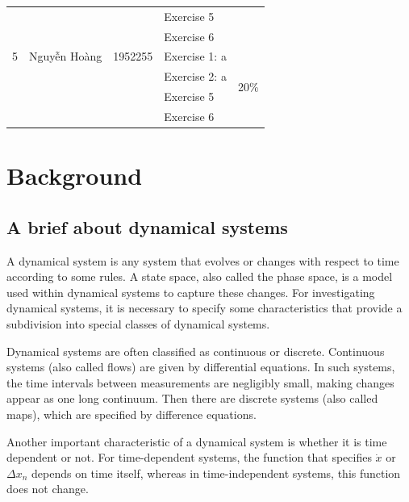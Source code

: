 \documentclass[a4paper]{article}
\numberwithin{equation}{section}
\begin{document}
\begin{center}
\begin{tabular}{llclc}
                 &                       &                     & Exercise 5        &                             \\
                 &                       &                     & Exercise 6        &                             \\
    \midrule
    5            & Nguyễn Hoàng          & 1952255             & Exercise 1: a     & \multirow{4}{*}{20\%}       \\
                 &                       &                     & Exercise 2: a     &                             \\
                 &                       &                     & Exercise 5        &                             \\
                 &                       &                     & Exercise 6        &                             \\
    \bottomrule
  \end{tabular}
\end{center}


\newpage
\section{Background}
\subsection{A brief about dynamical systems}
A dynamical system is any system that evolves or changes with respect to time according to some rules.
A state space, also called the phase space, is a model used within dynamical systems to capture these changes.
For investigating dynamical systems, it is necessary to specify some characteristics that provide a subdivision into special classes of dynamical systems.

Dynamical systems are often classified as continuous or discrete.
Continuous systems (also called flows) are given by differential equations.
In such systems, the time intervals between measurements are negligibly small, making changes appear as one long continuum.
Then there are discrete systems (also called maps), which are specified by difference equations.

Another important characteristic of a dynamical system is whether it is time dependent or not.
For time-dependent systems, the function that specifies \( \dot{x} \) or \( \Delta{x_n} \) depends on time itself, whereas in time-independent systems, this function does not change.
\end{document}
